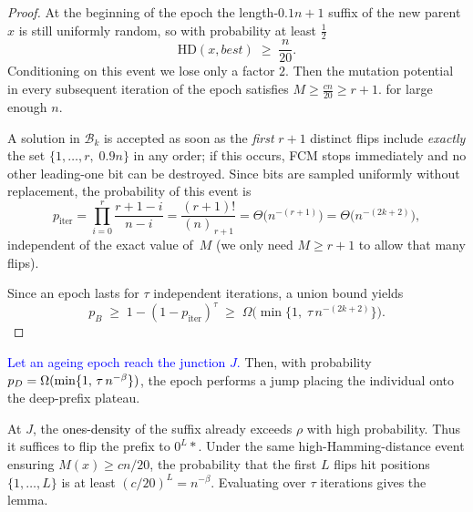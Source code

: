 \begin{proof}
	At the beginning of the epoch %
	the length-\(0.1n+1\) suffix of the new parent \(x\) is still uniformly random,
	so with probability at least \(\tfrac12\)
	\[
	\mathrm{HD}(x,best)\;\ge\;\frac{n}{20}.
	\]
	Conditioning on this event we lose only a factor \(2\).
	Then the mutation potential in every subsequent
	iteration of the epoch satisfies
	\(
	M\ge \tfrac{cn}{20}  \geq r+1.
	\) for large enough $n$.
	
	A solution in $\mathcal{B}_k$ is accepted as soon as the \emph{first} $r{+}1$ distinct flips
	include \emph{exactly} the set
	\(\{1,\dots,r,\;0.9n\}\)
	in any order; if this occurs, FCM stops immediately and no other
	leading-one bit can be destroyed.
	Since bits are sampled uniformly without replacement, the probability of
	this event is
	\[
	p_{\text{iter}}
	=\prod_{i=0}^{r}\frac{r+1-i}{n-i}
	=\frac{(r+1)!}{(n)_{\,r+1}}
	=\Theta\!\bigl(n^{-(r+1)}\bigr)
	=\Theta\!\bigl(n^{-(2k+2)}\bigr),
	\]
	independent of the exact value of~$M$ (we only need $M\ge r{+}1$ to allow that
	many flips).
	
	Since an epoch lasts for \(\tau\) independent iterations, a union bound yields
	\[
	p_B
	\;\ge\;
	1-(1-p_{\text{iter}})^{\tau}
	\;\ge\;
	\Omega\!\bigl(\min\{1,\;\tau\,n^{-(2k+2)}\}\bigr).
	\]
	
	\noindent
\end{proof}



\begin{lemma} \label{lem:DPO-epoch}
	\textcolor{blue}{Let an ageing epoch reach the junction $J$.} %
	Then, with probability $\textcolor{black}{p_D}=\Omega(\min\{1,\,\tau\,n^{-\beta}\})$, the epoch performs a jump placing the individual onto the deep-prefix plateau.
\end{lemma}

At $J$, the \textcolor{black}{ones-density} of the suffix already exceeds $\rho$ with high probability.
Thus it suffices to flip the prefix to $0^L *$.
Under the same high-Hamming-distance event ensuring $M(x)\ge cn/20$, the probability that the first $L$ flips hit positions $\{1,\dots,L\}$ is at least $(c/20)^L = n^{-\beta}$.
Evaluating over $\tau$ iterations gives the lemma.

